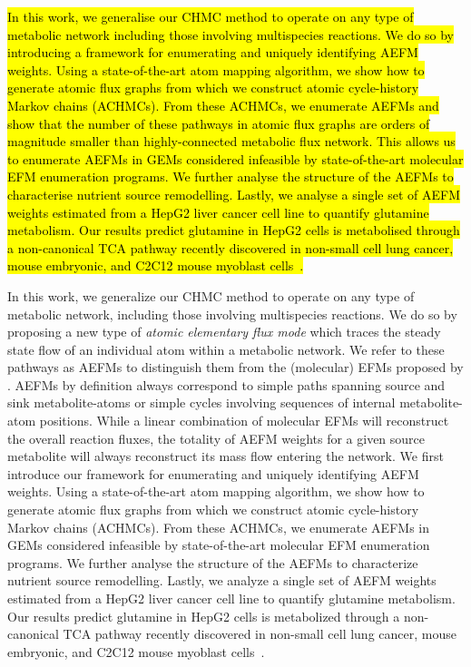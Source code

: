 \documentclass[12pt]{article}
\begin{document}
\hl{
In this work, we generalise our CHMC method to operate on any type of
metabolic network including those involving multispecies reactions. We do
so by introducing a framework for enumerating and uniquely identifying
AEFM weights. Using a state-of-the-art atom mapping algorithm, we show how
to generate atomic flux graphs from which we construct atomic
cycle-history Markov chains (ACHMCs). From these ACHMCs, we enumerate
AEFMs and show that the number of these pathways in atomic flux graphs are
orders of magnitude smaller than highly-connected metabolic flux network.
This allows us to enumerate AEFMs in GEMs considered infeasible by
state-of-the-art molecular EFM enumeration programs. We further analyse
the structure of the AEFMs to characterise nutrient source remodelling.
Lastly, we analyse a single set of AEFM weights estimated from a HepG2
liver cancer cell line to quantify glutamine metabolism. Our results
predict glutamine in HepG2 cells is metabolised through a non-canonical
TCA pathway recently discovered in non-small cell lung cancer, mouse
embryonic, and C2C12 mouse myoblast cells~\citep{ArnoldPaigeK2022Anta}.
}
\iffalse

In this work, we generalize our CHMC method to operate on any type of
metabolic network, including those involving multispecies reactions. We do
so by proposing a new type of \emph{atomic elementary flux mode} which
traces the steady state flow of an individual atom within a metabolic
network. We refer to these pathways as AEFMs to distinguish them from the
(molecular) EFMs proposed by \citeauthor{SchusterStefan1994Oefm}. AEFMs by
definition always correspond to simple paths spanning source and sink
metabolite-atoms or simple cycles involving sequences of internal
metabolite-atom positions. While a linear combination of molecular EFMs
will reconstruct the overall reaction fluxes, the totality of AEFM weights
for a given source metabolite will always reconstruct its mass flow
entering the network. We first introduce our framework for enumerating and
uniquely identifying AEFM weights. Using a state-of-the-art atom mapping
algorithm, we show how to generate atomic flux graphs from which we
construct atomic cycle-history Markov chains (ACHMCs). From these ACHMCs,
we enumerate AEFMs in GEMs considered infeasible by state-of-the-art
molecular EFM enumeration programs. We further analyse the structure of
the AEFMs to characterize nutrient source remodelling. Lastly, we analyze
a single set of AEFM weights estimated from a HepG2 liver cancer cell line
to quantify glutamine metabolism. Our results predict glutamine in HepG2
cells is metabolized through a non-canonical TCA pathway recently
discovered in non-small cell lung cancer, mouse embryonic, and C2C12 mouse
myoblast cells~\citep{ArnoldPaigeK2022Anta}.
\end{document}
